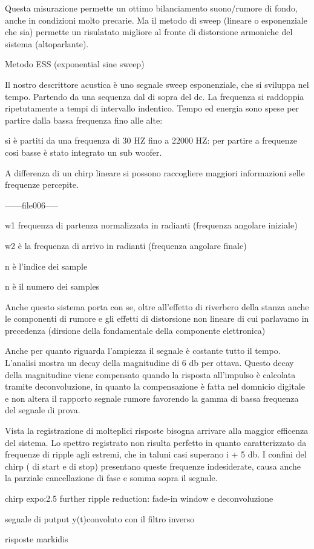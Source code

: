 Questa misurazione permette un ottimo bilanciamento suono/rumore di fondo, anche in condizioni molto precarie.
Ma il metodo  di sweep (lineare o esponenziale che sia) permette un risulatato migliore al fronte di distorsione armoniche del sistema (altoparlante).

Metodo ESS (exponential sine sweep)

Il nostro descrittore acustica è uno segnale sweep esponenziale, che si sviluppa nel tempo.
Partendo da una sequenza dal di sopra del dc. 
La frequenza si raddoppia ripetutamente a tempi di intervallo indentico. Tempo ed energia sono spese per partire dalla bassa frequenza fino alle alte:

si è partiti da una frequenza di 30 HZ fino a 22000 HZ:
per partire a frequenze cosi basse è stato integrato un sub woofer.

A differenza di un chirp lineare si possono raccogliere maggiori informazioni selle frequenze percepite. 

------file006-----

w1 frequenza di partenza normalizzata in radianti (frequenza angolare iniziale)

w2 è la frequenza di arrivo in radianti (frequenza angolare finale)

n è l'indice dei sample

n è il numero dei samples

Anche questo sistema porta con se, oltre all'effetto di riverbero della stanza anche le componenti di rumore e gli effetti di distorsione non lineare di cui parlavamo in precedenza (dirsione della fondamentale della componente elettronica)

Anche per quanto riguarda l'ampiezza il segnale è costante tutto il tempo. L'analisi mostra un decay della magnitudine di 6 db per ottava. Questo decay della magnitudine viene compensato quando la risposta all'impulso è calcolata tramite deconvoluzione, in quanto la compensazione è fatta nel domnicio digitale e non altera il rapporto segnale rumore favorendo la gamma di bassa frequenza del segnale di prova.

Vista la registrazione di molteplici risposte bisogna arrivare alla maggior efficenza del sistema.
 Lo spettro registrato non risulta perfetto in quanto caratterizzato da frequenze di ripple agli estremi, che in taluni casi superano i + 5 db. I confini del chirp ( di start e di stop) presentano queste frequenze indesiderate, causa anche la parziale cancellazione di fase e somma sopra il segnale. 


chirp expo:2.5 further ripple reduction: fade-in window  e deconvoluzione

segnale di putput y(t)convoluto con il filtro inverso

risposte markidis


